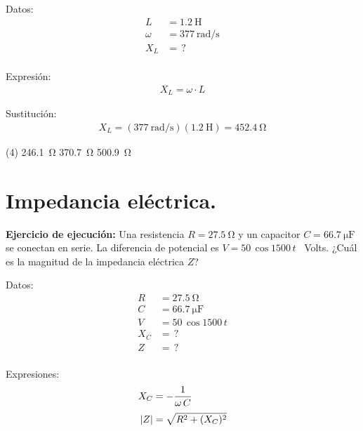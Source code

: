 \documentclass[12pt, letter]{exam}
\begin{document}
\begin{questions}
    \begin{minipage}[t]{0.35\linewidth}
    Datos: 
    \begin{align*}
    L &= \SI{1.2}{\henry} \\[0.3em]
    \omega &= \SI{377}{\radian\per\second} \\[0.3em]
    X_{L} &= \, ? \\
    \end{align*}
    \end{minipage}
    \hspace{1cm}
    \begin{minipage}[t]{0.4\linewidth}
    Expresión:
    \begin{align*}
    X_{L} = \omega \cdot L
    \end{align*}
    \end{minipage}
    
    Sustitución:
    \begin{align*}
    X_{L} = (\SI{377}{\radian\per\second})(\SI{1.2}{\henry}) = \SI{452.4}{\ohm}
    \end{align*}

    \vspace{0.3cm}
    \begin{tasks}(4)
        \task \SI{246.1}{\ohm}
        \task \SI{370.7}{\ohm}
        \task {}
        \task \SI{500.9}{\ohm}
    \end{tasks}

    \setcounter{section}{14} 
    \section{Impedancia eléctrica.}

    \setcounter{question}{32} \question \textbf{Ejercicio de ejecución: } Una resistencia $R = \SI{27.5}{\ohm}$ y un capacitor $C = \SI{66.7}{\micro\farad}$ se conectan en serie. La diferencia de potencial es $V = \num{50} \, \cos 1500 \, t$ \, Volts. ¿Cuál es la magnitud de la impedancia eléctrica $Z$?
    
    \begin{minipage}[t]{0.35\linewidth}
    Datos: 
    \begin{align*}
    R &= \SI{27.5}{\ohm} \\[0.3em]
    C &= \SI{66.7}{\micro\farad} \\[0.3em]
    V &= \num{50} \, \cos 1500 \, t \\[0.3em]
    X_{C} &= \, ? \\[0.3em]
    Z &= \, ? \\
    \end{align*}
    \end{minipage}
    \hspace{1cm}
    \begin{minipage}[t]{0.4\linewidth}
    Expresiones:
    \begin{align*}
    X_{C} &= - \dfrac{1}{\omega \, C} \\[0.3em]
    \abs{Z} &= \sqrt{R^{2} + (X_{C})^{2}}
    \end{align*}
    \end{minipage}
    

\end{questions}
\end{document}
